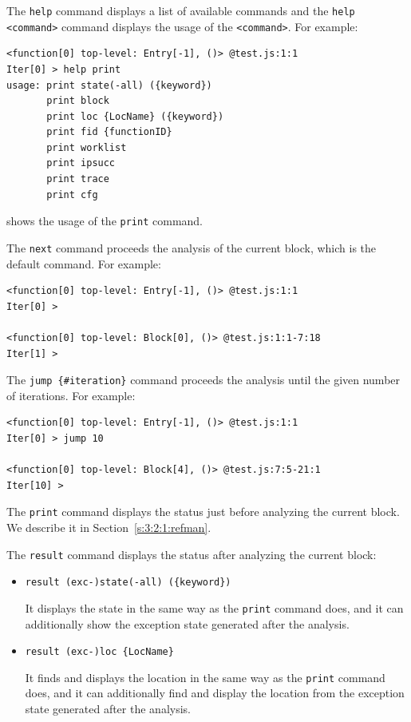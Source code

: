 The \verb!help! command displays a list of available commands and
the \verb!help <command>! command displays the usage of the \verb!<command>!.
For example:
{\small
\begin{verbatim}
<function[0] top-level: Entry[-1], ()> @test.js:1:1
Iter[0] > help print
usage: print state(-all) ({keyword})
       print block
       print loc {LocName} ({keyword})
       print fid {functionID}
       print worklist
       print ipsucc
       print trace
       print cfg
\end{verbatim}
}
\noindent
shows the usage of the \verb!print! command.

\medskip
The \verb!next! command proceeds the analysis of the current block,
which is the default command.  For example:
{\small
\begin{verbatim}
<function[0] top-level: Entry[-1], ()> @test.js:1:1
Iter[0] >

<function[0] top-level: Block[0], ()> @test.js:1:1-7:18
Iter[1] >
\end{verbatim}
}

\medskip
The \verb!jump {#iteration}! command proceeds the analysis until the given
number of iterations.  For example:
{\small
\begin{verbatim}
<function[0] top-level: Entry[-1], ()> @test.js:1:1
Iter[0] > jump 10

<function[0] top-level: Block[4], ()> @test.js:7:5-21:1
Iter[10] >
\end{verbatim}
}

\medskip
The \verb!print! command displays the status just before
analyzing the current block.  We describe it in Section~\ref{s:3:2:1:refman}.

\medskip
The \verb!result! command displays the status after analyzing
the current block:
\begin{itemize}
\item \verb!result (exc-)state(-all) ({keyword})!

It displays the state in the same way as the \verb!print! command does,
and it can additionally show the exception state generated after the analysis.
\item \verb!result (exc-)loc {LocName}!

It finds and displays the location in the same way as the \verb!print! command does,
and it can additionally find and display the location from
the exception state generated after the analysis.
\end{itemize}

